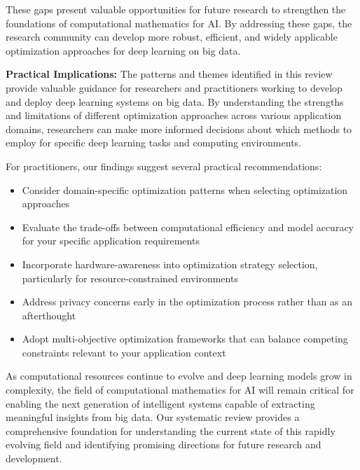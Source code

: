 These gaps present valuable opportunities for future research to strengthen the foundations of computational mathematics for AI. By addressing these gaps, the research community can develop more robust, efficient, and widely applicable optimization approaches for deep learning on big data.

\textbf{Practical Implications:} The patterns and themes identified in this review provide valuable guidance for researchers and practitioners working to develop and deploy deep learning systems on big data. By understanding the strengths and limitations of different optimization approaches across various application domains, researchers can make more informed decisions about which methods to employ for specific deep learning tasks and computing environments.

For practitioners, our findings suggest several practical recommendations:
\begin{itemize}
    \item Consider domain-specific optimization patterns when selecting optimization approaches
    \item Evaluate the trade-offs between computational efficiency and model accuracy for your specific application requirements
    \item Incorporate hardware-awareness into optimization strategy selection, particularly for resource-constrained environments
    \item Address privacy concerns early in the optimization process rather than as an afterthought
    \item Adopt multi-objective optimization frameworks that can balance competing constraints relevant to your application context
\end{itemize}

As computational resources continue to evolve and deep learning models grow in complexity, the field of computational mathematics for AI will remain critical for enabling the next generation of intelligent systems capable of extracting meaningful insights from big data. Our systematic review provides a comprehensive foundation for understanding the current state of this rapidly evolving field and identifying promising directions for future research and development.
